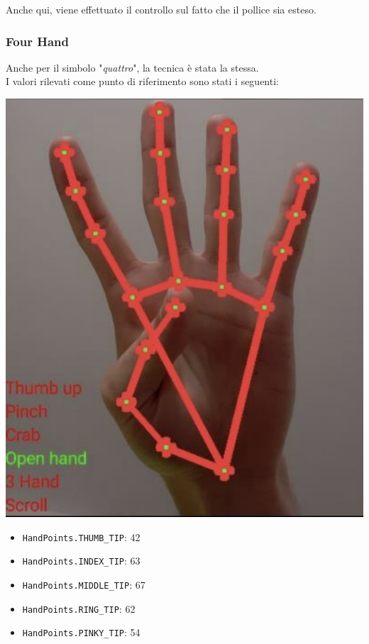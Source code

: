 \noindent Anche qui, viene effettuato il controllo sul fatto che il pollice sia esteso.


\subsubsection{Four Hand}
Anche per il simbolo "\textit{quattro}", la tecnica è stata la stessa.\\
I valori rilevati come punto di riferimento sono stati i seguenti:
\begin{multicols}{2}
    \begin{multicolfigure}
        \centering
        \includegraphics[width=\textwidth]{images/four_hand.png}
    \end{multicolfigure}
    \columnbreak
    \begin{itemize}
        \item \texttt{HandPoints.THUMB\_TIP}: 42
        \item \texttt{HandPoints.INDEX\_TIP}: 63
        \item \texttt{HandPoints.MIDDLE\_TIP}: 67
        \item \texttt{HandPoints.RING\_TIP}: 62
        \item \texttt{HandPoints.PINKY\_TIP}: 54
    \end{itemize} 
\end{multicols}


